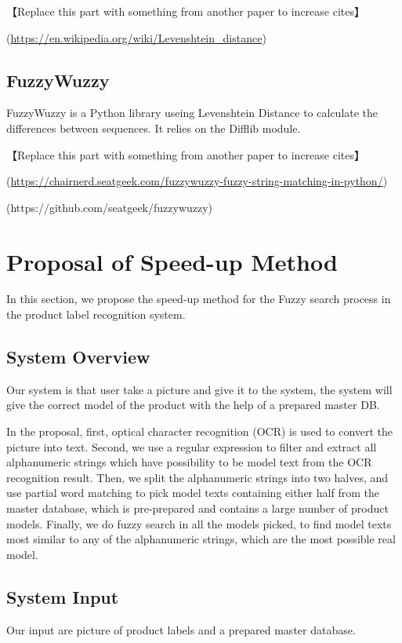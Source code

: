 \documentclass[technicalreport]{ieicej}
\begin{document}
        【Replace this part with something from another paper to increase cites】

        (\url{https://en.wikipedia.org/wiki/Levenshtein_distance})

    \subsection{FuzzyWuzzy}
        FuzzyWuzzy is a Python library useing Levenshtein Distance to calculate the differences between sequences. It relies on the Difflib module.

        【Replace this part with something from another paper to increase cites】

        (\url{https://chairnerd.seatgeek.com/fuzzywuzzy-fuzzy-string-matching-in-python/})
        
        (https://github.com/seatgeek/fuzzywuzzy)

\section{Proposal of Speed-up Method}
\label{sec:algorithm}
    In this section, we propose the speed-up method for the Fuzzy search process in the product label recognition system.

    \subsection{System Overview}
        Our system is that user take a picture and give it to the system, the system will give the correct model of the product with the help of a prepared master DB.

        In the proposal, first, optical character recognition (OCR) is used to convert the picture into text. Second, we use a regular expression to filter and extract all alphanumeric strings which have possibility to be model text from the OCR recognition result. Then, we split the alphanumeric strings into two halves, and use partial word matching to pick model texts containing either half from the master database, which is pre-prepared and contains a large number of product models. Finally, we do fuzzy search in all the models picked, to find model texts most similar to any of the alphanumeric strings, which are the most possible real model. 
        
    \subsection{System Input}
    \label{sec:algorithm.ocrregex}
        Our input are picture of product labels and a prepared master database.
\end{document}
